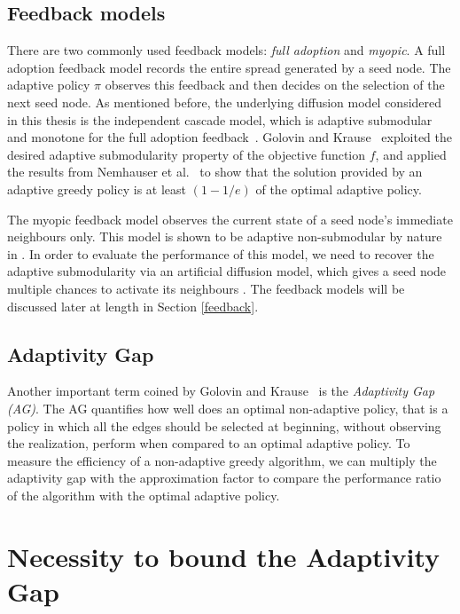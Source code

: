 \subsection*{Feedback models}

There are two commonly used feedback models: \textit{full adoption} and \textit{myopic}. A full adoption feedback model records the entire spread generated by a seed node. The adaptive policy $\pi$ observes this feedback and then decides on the selection of the next seed node. As mentioned before, the underlying diffusion model considered in this thesis is the independent cascade model, which is adaptive submodular and monotone for the full adoption feedback~\cite{Golovin2011a}. Golovin and Krause~\cite{Golovin2011a} exploited the desired adaptive submodularity property of the objective function $f$, and applied the results from Nemhauser et al.~\cite{nemhauser,Company1978} to show that the solution provided by an adaptive greedy policy is at least $(1-1/e)$ of the optimal adaptive policy.

The myopic feedback model observes the current state of a seed node's immediate neighbours only. This model is shown to be adaptive non-submodular by nature in \cite{Golovin2011}. In order to evaluate the performance of this model, we need to recover the adaptive submodularity via an artificial diffusion model, which gives a seed node multiple chances to activate its neighbours \cite{Chen2019, DAngeloPV21}. The feedback models will be discussed later at length in Section \ref{feedback}.

\subsection*{Adaptivity Gap}

Another important term coined by Golovin and Krause~\cite{Golovin2011a} is the \emph{Adaptivity Gap (AG)}. The AG quantifies how well does an optimal non-adaptive policy, that is a policy in which all the edges should be selected at beginning, without observing the realization, perform when compared to an optimal adaptive policy. To measure the efficiency of a non-adaptive greedy algorithm, we can multiply the adaptivity gap with the approximation factor to compare the performance ratio of the algorithm with the optimal adaptive policy.



\section{Necessity to bound the Adaptivity Gap} \label{sec:ag}

